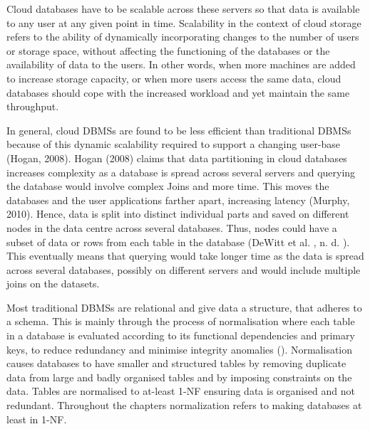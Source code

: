 Cloud databases have to be scalable across these servers so that data is
available to any user at any given point in time.  Scalability in the context of
cloud storage refers to the ability of dynamically incorporating changes to the
number of users or storage space,   without affecting the functioning of the
databases or the availability of data to the users.  In other words,   when more
machines are added to increase storage capacity,   or when more users access the
same data,   cloud databases should cope with the increased workload and yet
maintain the same throughput. 

In general,   cloud \acp{DBMS} are found to be less efficient than traditional
\acp{DBMS} because of this dynamic scalability required to
support a changing user-base (Hogan,   2008).  Hogan (2008) claims that data
partitioning in cloud databases increases complexity as a database is spread
across several servers and querying the database would involve complex Joins and
more time.  This moves the databases and the user applications farther apart,  
increasing latency (Murphy,   2010).  Hence,   data is split into distinct individual
parts and saved on different nodes in the data centre across several databases. 
Thus,   nodes could have a subset of data or rows from each table in the database
(DeWitt et al. ,   n. d. ). This eventually means that querying would take longer time
as the data is spread across several databases,   possibly on different servers
and would include multiple joins on the datasets. 

Most traditional \acp{DBMS} are relational and give data a structure,   that
adheres to a schema.  This is mainly through the process of normalisation where
each table in a database is evaluated according to its functional dependencies
and primary keys,   to reduce redundancy and minimise integrity anomalies
().  Normalisation causes databases to have smaller and
structured tables by removing duplicate data from large and badly organised
tables and by imposing constraints on the data.  Tables are normalised to
at-least \ac{1-NF} ensuring data is organised and not redundant.  Throughout
the chapters normalization refers to making databases at least in \ac{1-NF}. 


